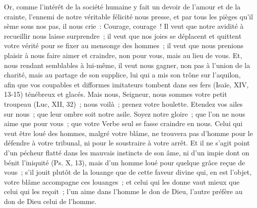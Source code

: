 \documentclass[french,twoside]{book} %
\begin{document}
Or, comme l’intérêt de la société humaine y fait un devoir de l’amour et de la crainte, l’ennemi de notre véritable félicité nous presse, et par tous les pièges qu’il sème sous nos pas, il nous crie : Courage, courage ! Il veut que notre avidité à recueillir nous laisse surprendre ; il veut que nos joies se déplacent et quittent votre vérité pour se fixer au mensonge des hommes ; il veut que nous prenions plaisir à nous faire aimer et craindre, non pour vous, mais au lieu de vous. Et, nous rendant semblables à lui-même, il veut nous gagner, non pas à l’union de la charité, mais au partage de son supplice, lui qui a mis son trône sur l’aquilon, afin que vos coupables et difformes imitateurs   tombent dans ses fers (Isaïe, XIV, 13-15) ténébreux et glacés. Mais nous, Seigneur, nous sommes votre petit troupeau (Luc, XII, 32) ; nous voilà ; prenez votre houlette. Etendez vos ailes sur nous ; que leur ombre soit notre asile. Soyez notre gloire ; que l’on ne nous aime que pour vous ; que votre Verbe seul se fasse craindre en nous. Celui qui veut être loué des hommes, malgré votre blâme, ne trouvera pas d’homme pour le défendre à votre tribunal, ni pour le soustraire à votre arrêt. Et il ne s’agit point d’un pécheur flatté dans les mauvais instincts de son âme, ni d’un impie dont on bénit l’iniquité (Ps. X, 13), mais d’un homme loué pour quelque grâce reçue de vous ; s’il jouit plutôt de la louange que de cette faveur divine qui, en est l’objet, votre blâme accompagne ces louanges ; et celui qui les donne vaut mieux que celui qui les reçoit ; l’un aime dans l’homme le don de Dieu, l’autre préfère au don de Dieu celui de l’homme.
\end{document}
